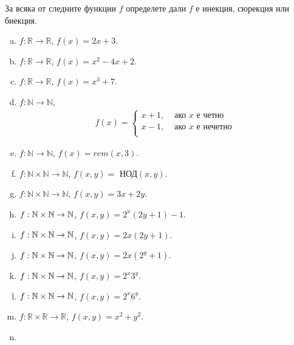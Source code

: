 \begin{prb}
  За всяка от следните  функции $f$ определете дали $f$ е
  инекция, сюрекция или биекция.
  \begin{enumerate}[a)]
  \item
    $f: \mathbb{R}\rightarrow \mathbb{R}$, $f(x) = 2x+3$.
  \item
    $f: \mathbb{R}\rightarrow \mathbb{R}$, $f(x) = x^2 - 4x +2$.
  \item 
    $f: \mathbb{R}\rightarrow \mathbb{R}$, $f(x) = x^3+7$.    
  \item
    $f: \mathbb{N}\rightarrow \mathbb{N}$, 
    \begin{align*}
      f(x) = 
      \begin{cases}
        x+1, & \mbox{ ако }x\mbox{ е четно}\\
        x-1, & \mbox{ ако }x\mbox{ е нечетно}\\
      \end{cases}
    \end{align*}
  \item
    $f: \mathbb{N}\rightarrow \mathbb{N}$, $f(x) = rem(x,3)$.
  \item 
    $f: \mathbb{N} \times \mathbb{N}\rightarrow \mathbb{N}$,
    $f(x, y) = \mbox{ НОД}(x,y)$.
  \item 
    $f: \mathbb{N} \times \mathbb{N}\rightarrow \mathbb{N}$,
    $f(x, y) = 3x+2y$.
  \item 
    $f: \mathbb{N} \times \mathbb{N}\rightarrow \mathbb{N}$,
    $f(x, y) = 2^x(2y+1)-1$.
  \item 
    $f: \mathbb{N} \times \mathbb{N}\rightarrow \mathbb{N}$,
    $f(x, y) = 2x(2y+1)$.
  \item
    $f: \mathbb{N} \times \mathbb{N}\rightarrow \mathbb{N}$,
    $f(x, y) = 2x(2^y+1)$.
  \item
    $f: \mathbb{N} \times \mathbb{N}\rightarrow \mathbb{N}$,
    $f(x, y) = 2^x3^y$.
  \item
    $f: \mathbb{N} \times \mathbb{N}\rightarrow \mathbb{N}$,
    $f(x, y) = 2^x6^y$.
  \item 
    $f: \mathbb{R} \times \mathbb{R}\rightarrow \mathbb{R}$,
    $f(x, y) = x^2+y^2$.
  \item
    
  \end{enumerate}
\end{prb}


